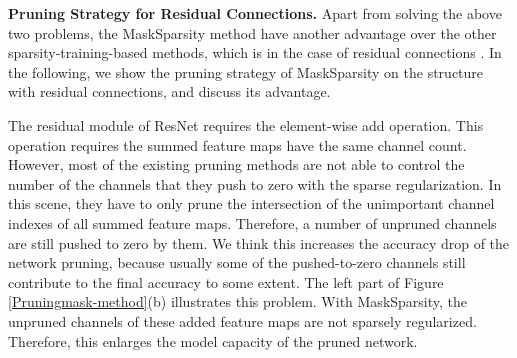 \documentclass[review]{cvpr}
\begin{document}





\textbf{Pruning Strategy for Residual Connections. }\label{Pruning with Residual-Connections} 
Apart from solving the above two problems, the MaskSparsity method have another advantage over the other sparsity-training-based methods, which is in the case of residual connections \cite{he2016deep}. In the following, we show the pruning strategy of MaskSparsity on the structure with residual connections, and discuss its advantage. 



The residual module of ResNet requires the element-wise add operation. This operation requires the summed feature maps have the same channel count. However, most of the existing pruning methods are not able to control the number of the channels that they push to zero with the sparse regularization. In this scene, they have to only prune the intersection of the unimportant channel indexes of all summed feature maps. Therefore, a number of unpruned channels are still pushed to zero by them. 
We think this increases the accuracy drop of the network pruning, because usually some of the pushed-to-zero channels still contribute to the final accuracy to some extent. The left part of Figure \ref{Pruningmask-method}(b) illustrates this problem. With MaskSparsity, the unpruned channels of these added feature maps are not sparsely regularized. Therefore, this enlarges the model capacity of the pruned network.
\end{document}
